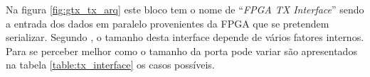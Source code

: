 Na figura \ref{fig:gtx_tx_arq} este bloco tem o nome de ``\textit{FPGA TX Interface}'' sendo a entrada dos dados em paralelo provenientes da FPGA que se pretendem serializar. Segundo \cite{R011}, o tamanho desta interface depende de vários fatores internos. Para se perceber melhor como o tamanho da porta pode variar são apresentados na tabela \ref{table:tx_interface} os casos possíveis.


\begin{table}[h!]
	\centering
		\caption[Tamanhos da interface da FPGA com o GTX transmissor]{Tamanhos da interface da FPGA com o GTX transmissor (adaptada de \cite{R011})}
	\label{table:tx_interface}
\end{table}
